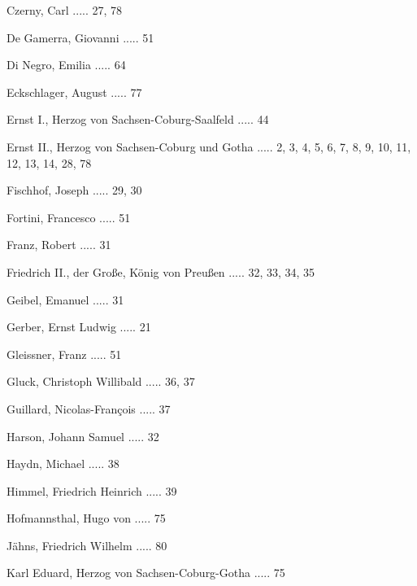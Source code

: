 \documentclass[a4paper, twocolumn, 11pt]{book}
\begin{document}
\newline 
Czerny, Carl ..... 27, 78

\newline 
De Gamerra, Giovanni ..... 51

\newline 
Di Negro, Emilia ..... 64

\newline 
Eckschlager, August ..... 77

\newline 
Ernst I., Herzog von Sachsen-Coburg-Saalfeld ..... 44

\newline 
Ernst II., Herzog von Sachsen-Coburg und Gotha ..... 2, 3, 4, 5, 6, 7, 8, 9, 10, 11, 12, 13, 14, 28, 78

\newline 
Fischhof, Joseph ..... 29, 30

\newline 
Fortini, Francesco ..... 51

\newline 
Franz, Robert ..... 31

\newline 
Friedrich II., der Große, König von Preußen ..... 32, 33, 34, 35

\newline 
Geibel, Emanuel ..... 31

\newline 
Gerber, Ernst Ludwig ..... 21

\newline 
Gleissner, Franz ..... 51

\newline 
Gluck, Christoph Willibald ..... 36, 37

\newline 
Guillard, Nicolas-François ..... 37

\newline 
Harson, Johann Samuel ..... 32

\newline 
Haydn, Michael ..... 38

\newline 
Himmel, Friedrich Heinrich ..... 39

\newline 
Hofmannsthal, Hugo von ..... 75

\newline 
Jähns, Friedrich Wilhelm ..... 80

\newline 
Karl Eduard, Herzog von Sachsen-Coburg-Gotha ..... 75
\end{document}
